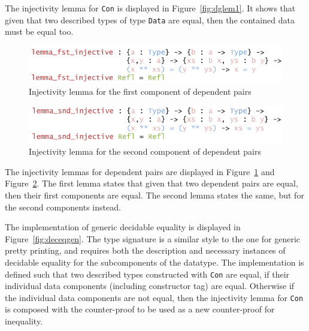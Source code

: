 \documentclass{ituthesis}
\newcommand{\ttconstructor}[1]{\textcolor{constructor-color}{\texttt{#1}}}
\newcommand{\tttype}[1]{\textcolor{type-color}{\texttt{#1}}}
\theoremstyle{break}
\begin{document}
The injectivity lemma for \ttconstructor{Con} is displayed in Figure~\ref{fig:dglem1}.
It shows that given that two described types of type \tttype{Data} are equal, then the contained data must be equal too.

\begin{figure}[ht]
\begin{center}
    \includegraphics[scale=0.5]{Figures/GenericDecEqLemma2.png}
\end{center}
\caption{Injectivity lemma for the first component of dependent pairs}
\label{fig:dglem2}
\end{figure}

\begin{figure}[ht]
\begin{center}
    \includegraphics[scale=0.5]{Figures/GenericDecEqLemma3.png}
\end{center}
\caption{Injectivity lemma for the second component of dependent pairs}
\label{fig:dglem3}
\end{figure}

The injectivity lemmas for dependent pairs are displayed in Figure~\ref{fig:dglem2} and Figure~\ref{fig:dglem3}.
The first lemma states that given that two dependent pairs are equal, then their first components are equal.
The second lemma states the same, but for the second components instead.

The implementation of generic decidable equality is displayed in Figure~\ref{fig:deceqgen}.
The type signature is a similar style to the one for generic pretty printing, and requires both the description
and necessary instances of decidable equality for the subcomponents of the datatype.
The implementation is defined such that two described types constructed with \ttconstructor{Con} are equal, if their individual data components (including constructor tag) are equal.
Otherwise if the individual data components are not equal, then the injectivity lemma for \ttconstructor{Con} is composed with the counter-proof to be used as a new counter-proof for inequality.
\end{document}
